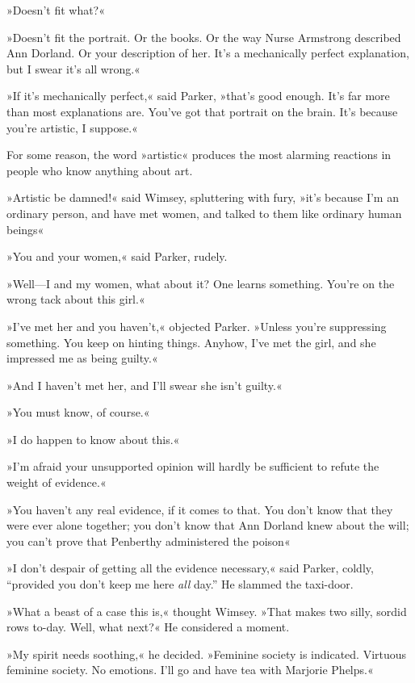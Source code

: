 »Doesn't fit what?«

»Doesn't fit the portrait. Or the books. Or the way Nurse Armstrong described Ann Dorland. Or your description of her. It's a mechanically perfect explanation, but I swear it's all wrong.«

»If it's mechanically perfect,« said Parker, »that's good enough. It's far more than most explanations are. You've got that portrait on the brain. It's because you're artistic, I suppose.«

For some reason, the word »artistic« produces the most alarming reactions in people who know anything about art.

»Artistic be damned!« said Wimsey, spluttering with fury, »it's because I'm an ordinary person, and have met women, and talked to them like ordinary human beings\longdash«

»You and your women,« said Parker, rudely.

»Well\allowbreak---\allowbreak I and my women, what about it? One learns something. You're on the wrong tack about this girl.«

»I've met her and you haven't,« objected Parker. »Unless you're suppressing something. You keep on hinting things. Anyhow, I've met the girl, and she impressed me as being guilty.«

»And I haven't met her, and I'll swear she isn't guilty.«

»You must know, of course.«

»I do happen to know about this.«

»I'm afraid your unsupported opinion will hardly be sufficient to refute the weight of evidence.«

»You haven't any real evidence, if it comes to that. You don't know that they were ever alone together; you don't know that Ann Dorland knew about the will; you can't prove that Penberthy administered the poison\longdash«

»I don't despair of getting all the evidence necessary,« said Parker, coldly, \enquote{provided you don't keep me here \textit{all} day.} He slammed the taxi-door.

»What a beast of a case this is,« thought Wimsey. »That makes two silly, sordid rows to-day. Well, what next?« He considered a moment.

»My spirit needs soothing,« he decided. »Feminine society is indicated. Virtuous feminine society. No emotions. I'll go and have tea with Marjorie Phelps.«